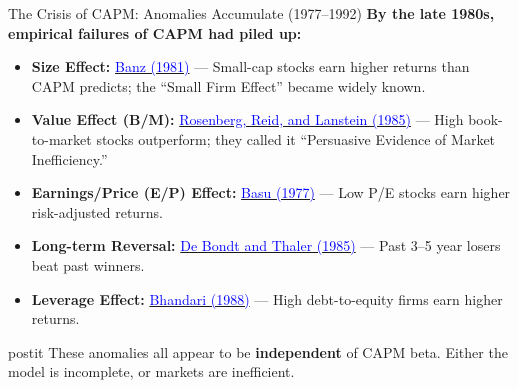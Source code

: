 \documentclass{beamer}
\begin{document}
\begin{frame}{The Crisis of CAPM: Anomalies Accumulate (1977--1992)}
	\textbf{By the late 1980s, empirical failures of CAPM had piled up:}
	\vspace{4pt}
	\begin{itemize}
		\item \textbf{Size Effect:} \href{https://doi.org/10.1016/0304-405X(81)90018-0}{\textcolor{blue}{Banz (1981)}} --- Small-cap stocks earn higher returns than CAPM predicts; the ``Small Firm Effect'' became widely known.
		\item \textbf{Value Effect (B/M):} \href{https://doi.org/10.3905/jpm.1985.409007}{\textcolor{blue}{Rosenberg, Reid, and Lanstein (1985)}} --- High book-to-market stocks outperform; they called it ``Persuasive Evidence of Market Inefficiency.''
		\item \textbf{Earnings/Price (E/P) Effect:} \href{https://doi.org/10.1111/j.1540-6261.1977.tb03327.x}{\textcolor{blue}{Basu (1977)}} --- Low P/E stocks earn higher risk-adjusted returns.
		\item \textbf{Long-term Reversal:} \href{https://doi.org/10.1111/j.1540-6261.1985.tb05004.x}{\textcolor{blue}{De Bondt and Thaler (1985)}} --- Past 3--5 year losers beat past winners.
		\item \textbf{Leverage Effect:} \href{https://doi.org/10.1111/j.1540-6261.1988.tb03952.x}{\textcolor{blue}{Bhandari (1988)}} --- High debt-to-equity firms earn higher returns.
	\end{itemize}
	\vspace{6pt}
	\begin{beamercolorbox}[sep=0.3em,wd=\linewidth,rounded=true,shadow=true]{postit}
		\small These anomalies all appear to be \textbf{independent} of CAPM beta. Either the model is incomplete, or markets are inefficient.
	\end{beamercolorbox}
\end{frame}
\end{document}
